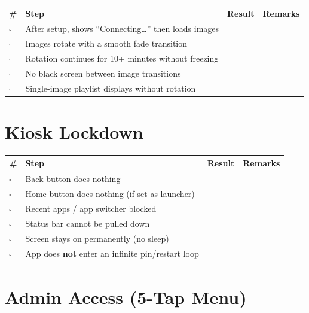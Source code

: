 \documentclass[11pt,a4paper]{article}
\newcommand{\checkbox}{$\square$\;}
\begin{document}
\begin{tabular}{@{}p{0.5cm}p{10cm}p{2cm}p{3cm}@{}}
\toprule
\textbf{\#} & \textbf{Step} & \textbf{Result} & \textbf{Remarks} \\
\midrule
\checkbox & After setup, shows ``Connecting\ldots'' then loads images & & \\[0.3cm]
\checkbox & Images rotate with a smooth fade transition & & \\[0.3cm]
\checkbox & Rotation continues for 10+ minutes without freezing & & \\[0.3cm]
\checkbox & No black screen between image transitions & & \\[0.3cm]
\checkbox & Single-image playlist displays without rotation & & \\
\bottomrule
\end{tabular}

\section{Kiosk Lockdown}

\begin{tabular}{@{}p{0.5cm}p{10cm}p{2cm}p{3cm}@{}}
\toprule
\textbf{\#} & \textbf{Step} & \textbf{Result} & \textbf{Remarks} \\
\midrule
\checkbox & Back button does nothing & & \\[0.3cm]
\checkbox & Home button does nothing (if set as launcher) & & \\[0.3cm]
\checkbox & Recent apps / app switcher blocked & & \\[0.3cm]
\checkbox & Status bar cannot be pulled down & & \\[0.3cm]
\checkbox & Screen stays on permanently (no sleep) & & \\[0.3cm]
\checkbox & App does \textbf{not} enter an infinite pin/restart loop & & \\
\bottomrule
\end{tabular}

\section{Admin Access (5-Tap Menu)}
\end{document}
